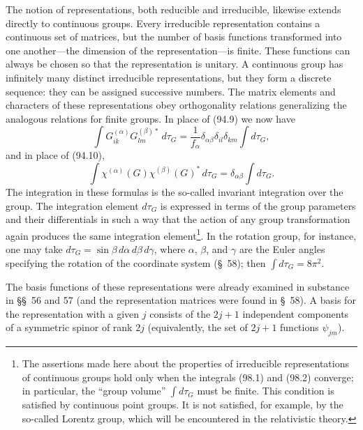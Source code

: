 The notion of representations, both reducible and irreducible, likewise extends directly to continuous groups. Every irreducible representation contains a continuous set of matrices, but the number of basis functions transformed into one another---the dimension of the representation---is finite. These functions can always be chosen so that the representation is unitary. A continuous group has infinitely many distinct irreducible representations, but they form a discrete sequence: they can be assigned successive numbers. The matrix elements and characters of these representations obey orthogonality relations generalizing the analogous relations for finite groups. In place of (94.9) we now have
\begin{equation}
 \int G_{ik}^{(\alpha)}G_{lm}^{(\beta)*}\,d\tau_G
 =\frac1{f_\alpha}\delta_{\alpha\beta}\delta_{il}\delta_{km}\int d\tau_G,
 \tag{98.1}
\end{equation}
and in place of (94.10),
\begin{equation}
 \int\chi^{(\alpha)}(G)\chi^{(\beta)}(G)^*\,d\tau_G
 =\delta_{\alpha\beta}\int d\tau_G.
 \tag{98.2}
\end{equation}
The integration in these formulas is the so-called invariant integration over the group. The integration element $d\tau_G$ is expressed in terms of the group parameters and their differentials in such a way that the action of any group transformation again produces the same integration element\footnote{The assertions made here about the properties of irreducible representations of continuous groups hold only when the integrals (98.1) and (98.2) converge; in particular, the ``group volume'' $\int d\tau_G$ must be finite. This condition is satisfied by continuous point groups. It is not satisfied, for example, by the so-called Lorentz group, which will be encountered in the relativistic theory.}. In the rotation group, for instance, one may take $d\tau_G=\sin\beta\,d\alpha\,d\beta\,d\gamma$, where $\alpha$, $\beta$, and $\gamma$ are the Euler angles specifying the rotation of the coordinate system (§~58); then $\int d\tau_G=8\pi^2$.



The basis functions of these representations were already examined in substance in §§~56 and 57 (and the representation matrices were found in §~58). A basis for the representation with a given $j$ consists of the $2j+1$ independent components of a symmetric spinor of rank $2j$ (equivalently, the set of $2j+1$ functions $\psi_{jm}$).

